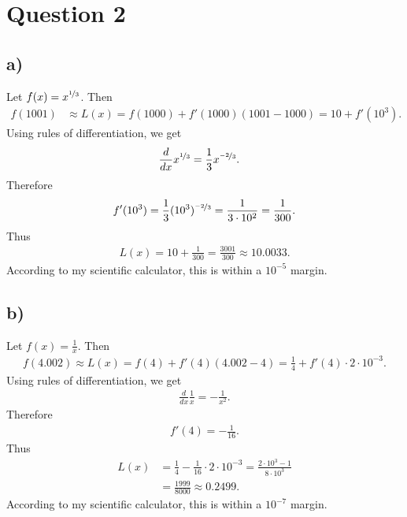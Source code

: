 \documentclass{article}
\begin{document}
\section*{Question 2}
\subsection*{a)}
Let $f(x)=x^{\nicefrac{1}{3}}$. Then
\begin{align*}
	f(1001) & \approx L(x)= f(1000)+f'(1000)(1001-1000)=10+f'(10^3).
\end{align*}
Using rules of differentiation, we get
\begin{align*}
	\frac{d}{dx}x^{\nicefrac{1}{3}} & =\frac{1}{3}x^{\nicefrac{-2}{3}}.
\end{align*}
Therefore
\begin{align*}
	f'(10^3)=\frac{1}{3}(10^3)^{\nicefrac{-2}{3}}=\frac{1}{3\cdot10^2}=\frac{1}{300}.
\end{align*}
Thus
\begin{align*}
	L(x)=10+\frac{1}{300}=\frac{3001}{300}\approx10.0033.
\end{align*}
According to my scientific calculator, this is within a $10^{-5}$ margin.
\subsection*{b)}
Let $f(x)=\frac{1}{x}$. Then
\begin{align*}
	f(4.002)\approx L(x)=f(4)+f'(4)(4.002-4)=\frac{1}{4}+f'(4)\cdot2\cdot10^{-3}.
\end{align*}
Using rules of differentiation, we get
\begin{align*}
	\frac{d}{dx}\frac{1}{x}=-\frac{1}{x^2}.
\end{align*}
Therefore
\begin{align*}
	f'(4)=-\frac{1}{16}.
\end{align*}
Thus
\begin{align*}
	L(x) & =\frac{1}{4}-\frac{1}{16}\cdot 2\cdot 10^{-3}=\frac{2\cdot 10^3-1}{8\cdot10^3} \\
	     & =\frac{1999}{8000}\approx0.2499.
\end{align*}
According to my scientific calculator, this is within a $10^{-7}$ margin.
\end{document}
